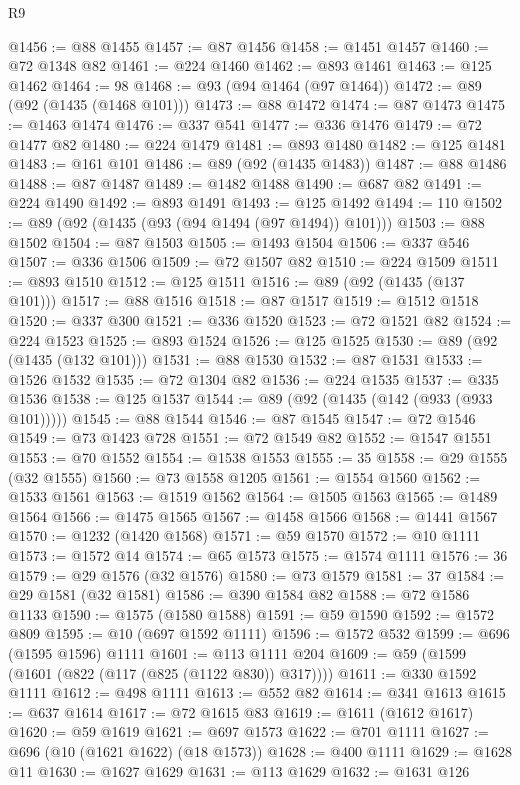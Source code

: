 \begin{lexlean}{R9}
\begin{coremodule}
@1456 := @88 @1455
@1457 := @87 @1456
@1458 := @1451 @1457
@1460 := @72 @1348 @82
@1461 := @224 @1460
@1462 := @893 @1461
@1463 := @125 @1462
@1464 := 98
@1468 := @93 (@94 @1464 (@97 @1464))
@1472 := @89 (@92 (@1435 (@1468 @101)))
@1473 := @88 @1472
@1474 := @87 @1473
@1475 := @1463 @1474
@1476 := @337 @541
@1477 := @336 @1476
@1479 := @72 @1477 @82
@1480 := @224 @1479
@1481 := @893 @1480
@1482 := @125 @1481
@1483 := @161 @101
@1486 := @89 (@92 (@1435 @1483))
@1487 := @88 @1486
@1488 := @87 @1487
@1489 := @1482 @1488
@1490 := @687 @82
@1491 := @224 @1490
@1492 := @893 @1491
@1493 := @125 @1492
@1494 := 110
@1502 := @89 (@92 (@1435 (@93 (@94 @1494 (@97 @1494)) @101)))
@1503 := @88 @1502
@1504 := @87 @1503
@1505 := @1493 @1504
@1506 := @337 @546
@1507 := @336 @1506
@1509 := @72 @1507 @82
@1510 := @224 @1509
@1511 := @893 @1510
@1512 := @125 @1511
@1516 := @89 (@92 (@1435 (@137 @101)))
@1517 := @88 @1516
@1518 := @87 @1517
@1519 := @1512 @1518
@1520 := @337 @300
@1521 := @336 @1520
@1523 := @72 @1521 @82
@1524 := @224 @1523
@1525 := @893 @1524
@1526 := @125 @1525
@1530 := @89 (@92 (@1435 (@132 @101)))
@1531 := @88 @1530
@1532 := @87 @1531
@1533 := @1526 @1532
@1535 := @72 @1304 @82
@1536 := @224 @1535
@1537 := @335 @1536
@1538 := @125 @1537
@1544 := @89 (@92 (@1435 (@142 (@933 (@933 @101)))))
@1545 := @88 @1544
@1546 := @87 @1545
@1547 := @72 @1546
@1549 := @73 @1423 @728
@1551 := @72 @1549 @82
@1552 := @1547 @1551
@1553 := @70 @1552
@1554 := @1538 @1553
@1555 := 35
@1558 := @29 @1555 (@32 @1555)
@1560 := @73 @1558 @1205
@1561 := @1554 @1560
@1562 := @1533 @1561
@1563 := @1519 @1562
@1564 := @1505 @1563
@1565 := @1489 @1564
@1566 := @1475 @1565
@1567 := @1458 @1566
@1568 := @1441 @1567
@1570 := @1232 (@1420 @1568)
@1571 := @59 @1570
@1572 := @10 @1111
@1573 := @1572 @14
@1574 := @65 @1573
@1575 := @1574 @1111
@1576 := 36
@1579 := @29 @1576 (@32 @1576)
@1580 := @73 @1579
@1581 := 37
@1584 := @29 @1581 (@32 @1581)
@1586 := @390 @1584 @82
@1588 := @72 @1586 @1133
@1590 := @1575 (@1580 @1588)
@1591 := @59 @1590
@1592 := @1572 @809
@1595 := @10 (@697 @1592 @1111)
@1596 := @1572 @532
@1599 := @696 (@1595 @1596) @1111
@1601 := @113 @1111 @204
@1609 := @59 (@1599 (@1601 (@822 (@117 (@825 (@1122 @830)) @317))))
@1611 := @330 @1592 @1111
@1612 := @498 @1111
@1613 := @552 @82
@1614 := @341 @1613
@1615 := @637 @1614
@1617 := @72 @1615 @83
@1619 := @1611 (@1612 @1617)
@1620 := @59 @1619
@1621 := @697 @1573
@1622 := @701 @1111
@1627 := @696 (@10 (@1621 @1622) (@18 @1573))
@1628 := @400 @1111
@1629 := @1628 @11
@1630 := @1627 @1629
@1631 := @113 @1629
@1632 := @1631 @126

\end{coremodule}
\end{lexlean}
